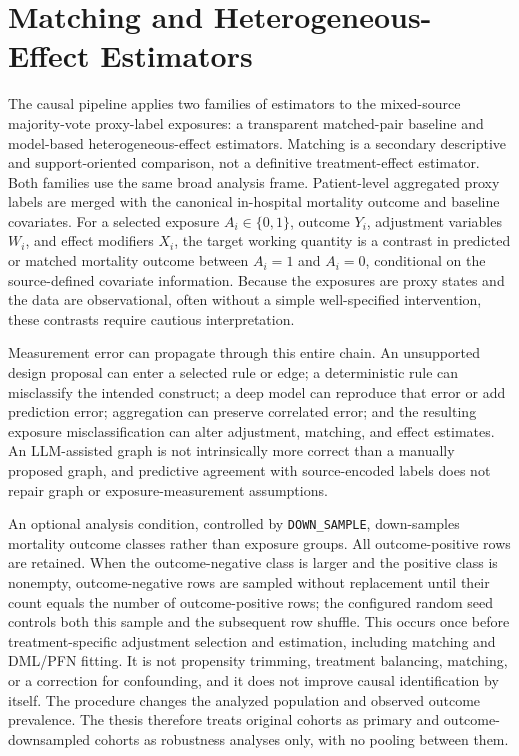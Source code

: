 \section{Matching and Heterogeneous-Effect Estimators}
\label{sec:causal-graph-effect-estimation-methodology:matching-heterogeneous-effect-estimators}
The causal pipeline applies two families of estimators to the mixed-source majority-vote proxy-label exposures: a transparent matched-pair baseline and model-based heterogeneous-effect estimators.  Matching is a secondary descriptive and support-oriented comparison, not a definitive treatment-effect estimator.  Both families use the same broad analysis frame.  Patient-level aggregated proxy labels are merged with the canonical in-hospital mortality outcome and baseline covariates.  For a selected exposure \(A_i \in \{0,1\}\), outcome \(Y_i\), adjustment variables \(W_i\), and effect modifiers \(X_i\), the target working quantity is a contrast in predicted or matched mortality outcome between \(A_i=1\) and \(A_i=0\), conditional on the source-defined covariate information.  Because the exposures are proxy states and the data are observational, often without a simple well-specified intervention, these contrasts require cautious interpretation.

Measurement error can propagate through this entire chain.  An unsupported design proposal can enter a selected rule or edge; a deterministic rule can misclassify the intended construct; a deep model can reproduce that error or add prediction error; aggregation can preserve correlated error; and the resulting exposure misclassification can alter adjustment, matching, and effect estimates.  An LLM-assisted graph is not intrinsically more correct than a manually proposed graph, and predictive agreement with source-encoded labels does not repair graph or exposure-measurement assumptions.

An optional analysis condition, controlled by \texttt{DOWN\_SAMPLE}, down-samples mortality outcome classes rather than exposure groups.  All outcome-positive rows are retained.  When the outcome-negative class is larger and the positive class is nonempty, outcome-negative rows are sampled without replacement until their count equals the number of outcome-positive rows; the configured random seed controls both this sample and the subsequent row shuffle.  This occurs once before treatment-specific adjustment selection and estimation, including matching and DML/PFN fitting.  It is not propensity trimming, treatment balancing, matching, or a correction for confounding, and it does not improve causal identification by itself.  The procedure changes the analyzed population and observed outcome prevalence.  The thesis therefore treats original cohorts as primary and outcome-downsampled cohorts as robustness analyses only, with no pooling between them.

